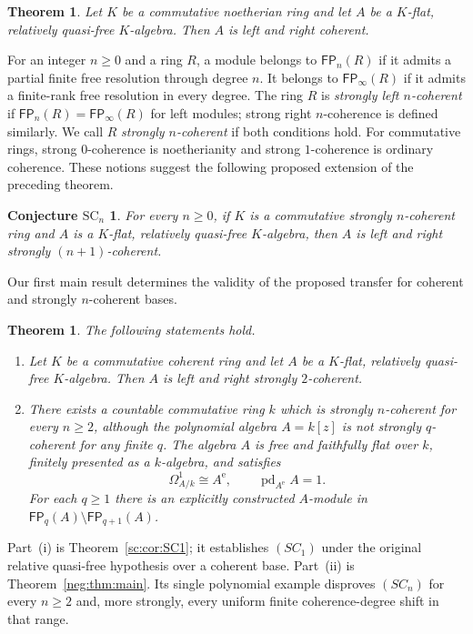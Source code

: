 \documentclass[11pt]{article}
\numberwithin{equation}{section}
\newtheorem{theorem}{Theorem}[section]
\newtheorem*{theorem*}{Theorem}
\newtheorem*{conjecture*}{Conjecture $\mathrm{SC}_n$}
\theoremstyle{definition}
\theoremstyle{remark}
\newcommand{\FP}{\mathsf{FP}}
\begin{document}
\begin{theorem*}
Let $K$ be a commutative noetherian ring and let $A$ be a $K$-flat,
relatively quasi-free $K$-algebra.  Then $A$ is left and right coherent.
\end{theorem*}

For an integer $n\ge0$ and a ring $R$, a module belongs to
$\FP_n(R)$ if it admits a partial finite free resolution through degree
$n$.  It belongs to $\FP_\infty(R)$ if it admits a finite-rank free
resolution in every degree.  The ring $R$ is \emph{strongly left
$n$-coherent} if $\FP_n(R)=\FP_\infty(R)$ for left modules; strong
right $n$-coherence is defined similarly.  We call $R$ \emph{strongly
$n$-coherent} if both conditions hold.  For commutative rings, strong
$0$-coherence is noetherianity and strong $1$-coherence is ordinary
coherence.  These notions suggest the following proposed extension of
the preceding theorem.

\begin{conjecture*}
For every $n\ge0$, if $K$ is a commutative strongly $n$-coherent ring
and $A$ is a $K$-flat, relatively quasi-free $K$-algebra, then $A$ is
left and right strongly $(n+1)$-coherent.
\end{conjecture*}

Our first main result determines the validity of the proposed transfer
for coherent and strongly $n$-coherent bases.

\begin{theorem}\label{thm:intro-main}
The following statements hold.
\begin{enumerate}[label=(\roman*)]
\item Let $K$ be a commutative coherent ring and let $A$ be a
      $K$-flat, relatively quasi-free $K$-algebra.  Then $A$ is left
      and right strongly $2$-coherent.
\item There exists a countable commutative ring $k$ which is strongly
      $n$-coherent for every $n\ge2$, although the polynomial algebra
      $A=k[z]$ is not strongly $q$-coherent for any finite $q$.
      The algebra $A$ is free and faithfully flat over $k$, finitely
      presented as a $k$-algebra, and satisfies
      \[
      \Omega^1_{A/k}\cong A^{\mathrm e},\qquad
      \operatorname{pd}_{A^{\mathrm e}}A=1.
      \]
      For each $q\ge1$ there is an explicitly constructed
      $A$-module in $\FP_q(A)\setminus\FP_{q+1}(A)$.
\end{enumerate}
\end{theorem}

Part~\textup{(i)} is Theorem~\ref{sc:cor:SC1}; it establishes $(SC_1)$
under the original relative quasi-free hypothesis over a coherent
base.  Part~\textup{(ii)} is Theorem~\ref{neg:thm:main}.  Its single
polynomial example disproves $(SC_n)$ for every $n\ge2$ and, more
strongly, every uniform finite coherence-degree shift in that range.
\end{document}
